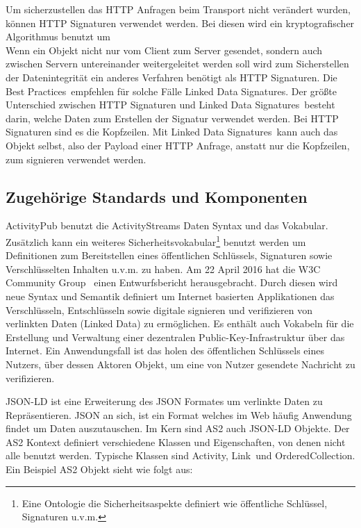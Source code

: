 		Um sicherzustellen das HTTP Anfragen beim Transport nicht verändert wurden, können HTTP Signaturen verwendet werden. Bei diesen wird ein kryptografischer Algorithmus benutzt um \\
		
		Wenn ein Objekt nicht nur vom Client zum Server gesendet, sondern auch zwischen Servern untereinander weitergeleitet werden soll wird zum Sicherstellen der Datenintegrität ein anderes Verfahren benötigt als HTTP Signaturen. Die \glqq Best Practices\grqq~empfehlen für solche Fälle \glqq Linked Data Signatures\grqq. Der größte Unterschied zwischen HTTP Signaturen und \glqq Linked Data Signatures\grqq~besteht darin, welche Daten zum Erstellen der Signatur verwendet werden. Bei HTTP Signaturen sind es die Kopfzeilen. Mit \glqq Linked Data Signatures\grqq~kann auch das Objekt selbst, also der Payload einer HTTP Anfrage, anstatt nur die Kopfzeilen, zum signieren verwendet werden.
	
	\subsection{Zugehörige Standards und Komponenten}
		ActivityPub benutzt die ActivityStreams Daten Syntax und das Vokabular. Zusätzlich kann ein weiteres Sicherheitsvokabular\footnote{Eine Ontologie die Sicherheitsaspekte definiert wie öffentliche Schlüssel, Signaturen u.v.m.} benutzt werden um Definitionen zum Bereitstellen eines öffentlichen Schlüssels, Signaturen sowie Verschlüsselten Inhalten u.v.m. zu haben. Am 22 April 2016 hat die \glqq W3C Community Group\grqq~ einen Entwurfsbericht herausgebracht. Durch diesen wird neue Syntax und Semantik definiert um Internet basierten Applikationen das Verschlüsseln, Entschlüsseln sowie digitale signieren und verifizieren von verlinkten Daten (Linked Data) zu ermöglichen. Es enthält auch Vokabeln für die Erstellung und Verwaltung einer dezentralen Public-Key-Infrastruktur über das Internet\cite{security-vocab-linked-data}. Ein Anwendungsfall ist das holen des öffentlichen Schlüssels eines Nutzers, über dessen Aktoren Objekt, um eine von Nutzer gesendete Nachricht zu verifizieren.
		
		\gls{JSON-LD} ist eine Erweiterung des JSON Formates um verlinkte Daten zu Repräsentieren. JSON an sich, ist ein Format welches im Web häufig Anwendung findet um Daten auszutauschen. Im Kern sind \gls{AS2} auch \gls{JSON-LD} Objekte. Der \gls{AS2} Kontext definiert verschiedene Klassen und Eigenschaften, von denen nicht alle benutzt werden. Typische Klassen sind \glqq Activity\grqq, \glqq Link\grqq~und \glqq OrderedCollection\grqq. Ein Beispiel \gls{AS2} Objekt sieht wie folgt aus: 	
		

